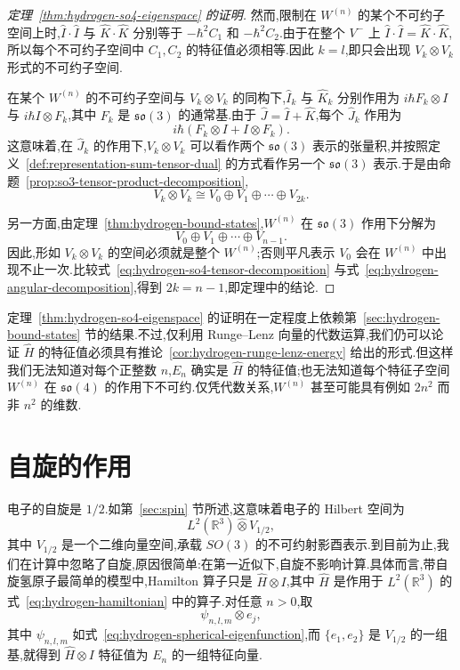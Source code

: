 {\begin{proof}[定理~\ref{thm:hydrogen-so4-eigenspace} 的证明]
然而,限制在 $W^{(n)}$ 的某个不可约子空间上时,$\widehat I\cdot\widehat I$ 与 $\widehat K\cdot\widehat K$ 分别等于 $-\hbar^2C_1$ 和 $-\hbar^2C_2$.由于在整个 $V^-$ 上 $\widehat I\cdot\widehat I=\widehat K\cdot\widehat K$,所以每个不可约子空间中 $C_1,C_2$ 的特征值必须相等.因此 $k=l$,即只会出现 $V_k\otimes V_k$ 形式的不可约子空间.

在某个 $W^{(n)}$ 的不可约子空间与 $V_k\otimes V_k$ 的同构下,$\widehat I_k$ 与 $\widehat K_k$ 分别作用为 $i\hbar F_k\otimes I$ 与 $i\hbar I\otimes F_k$,其中 $F_k$ 是 $\mathfrak{so}(3)$ 的通常基.由于 $\widehat J=\widehat I+\widehat K$,每个 $\widehat J_k$ 作用为
\[
 i\hbar(F_k\otimes I+I\otimes F_k).
\]
这意味着,在 $\widehat J_k$ 的作用下,$V_k\otimes V_k$ 可以看作两个 $\mathfrak{so}(3)$ 表示的张量积,并按照定义~\ref{def:representation-sum-tensor-dual} 的方式看作另一个 $\mathfrak{so}(3)$ 表示.于是由命题~\ref{prop:so3-tensor-product-decomposition},
\[
 V_k\otimes V_k\cong V_0\oplus V_1\oplus\cdots\oplus V_{2k}.
\label{eq:hydrogen-so4-tensor-decomposition}
\]

另一方面,由定理~\ref{thm:hydrogen-bound-states},$W^{(n)}$ 在 $\mathfrak{so}(3)$ 作用下分解为
\[
 V_0\oplus V_1\oplus\cdots\oplus V_{n-1}.
\label{eq:hydrogen-angular-decomposition}
\]
因此,形如 $V_k\otimes V_k$ 的空间必须就是整个 $W^{(n)}$;否则平凡表示 $V_0$ 会在 $W^{(n)}$ 中出现不止一次.比较式~\eqref{eq:hydrogen-so4-tensor-decomposition} 与式~\eqref{eq:hydrogen-angular-decomposition},得到 $2k=n-1$,即定理中的结论.
\end{proof}

定理~\ref{thm:hydrogen-so4-eigenspace} 的证明在一定程度上依赖第~\ref{sec:hydrogen-bound-states} 节的结果.不过,仅利用 Runge--Lenz 向量的代数运算,我们仍可以论证 $\widehat H$ 的特征值必须具有推论~\ref{cor:hydrogen-runge-lenz-energy} 给出的形式.但这样我们无法知道对每个正整数 $n$,$E_n$ 确实是 $\widehat H$ 的特征值;也无法知道每个特征子空间 $W^{(n)}$ 在 $\mathfrak{so}(4)$ 的作用下不可约.仅凭代数关系,$W^{(n)}$ 甚至可能具有例如 $2n^2$ 而非 $n^2$ 的维数.

\section{自旋的作用}
\label{sec:spin-role-hydrogen}

电子的自旋是 $1/2$.如第~\ref{sec:spin} 节所述,这意味着电子的 Hilbert 空间为
\[
 L^2(\mathbb R^3)\widehat\otimes V_{1/2},
\]
其中 $V_{1/2}$ 是一个二维向量空间,承载 $SO(3)$ 的不可约射影酉表示.到目前为止,我们在计算中忽略了自旋,原因很简单:在第一近似下,自旋不影响计算.具体而言,带自旋氢原子最简单的模型中,Hamilton 算子只是 $\widehat H\otimes I$,其中 $\widehat H$ 是作用于 $L^2(\mathbb R^3)$ 的式~\eqref{eq:hydrogen-hamiltonian} 中的算子.对任意 $n>0$,取
\[
 \psi_{n,l,m}\otimes e_j,
\]
其中 $\psi_{n,l,m}$ 如式~\eqref{eq:hydrogen-spherical-eigenfunction},而 $\{e_1,e_2\}$ 是 $V_{1/2}$ 的一组基,就得到 $\widehat H\otimes I$ 特征值为 $E_n$ 的一组特征向量.

}
